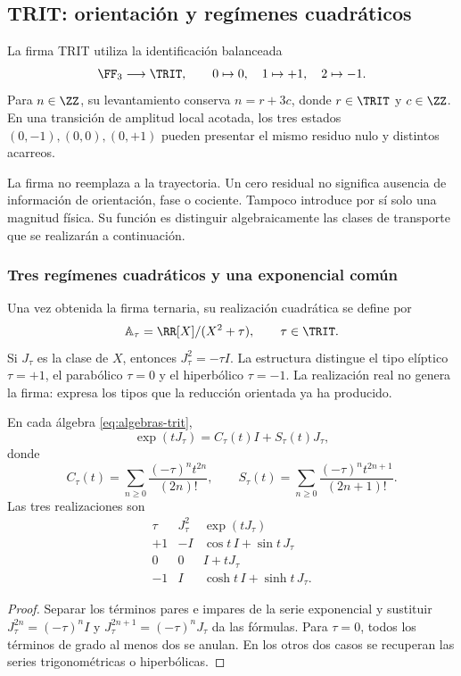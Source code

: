 \subsection{TRIT: orientación y regímenes cuadráticos}

\begin{definition}
La firma TRIT utiliza la identificación balanceada
\[
 \FF_3\longrightarrow\TRIT,\qquad 0\mapsto0,\quad1\mapsto+1,\quad2\mapsto-1.
\]
Para \(n\in\ZZ\), su levantamiento conserva \(n=r+3c\), donde \(r\in\TRIT\) y \(c\in\ZZ\). En una transición de amplitud local acotada, los tres estados \((0,-1),(0,0),(0,+1)\) pueden presentar el mismo residuo nulo y distintos acarreos.
\end{definition}

La firma no reemplaza a la trayectoria. Un cero residual no significa ausencia de información de orientación, fase o cociente. Tampoco introduce por sí solo una magnitud física. Su función es distinguir algebraicamente las clases de transporte que se realizarán a continuación.

\subsubsection{Tres regímenes cuadráticos y una exponencial común}

Una vez obtenida la firma ternaria, su realización cuadrática se define por
\begin{equation}
 \mathbb A_\tau=\RR[X]/(X^2+\tau),\qquad \tau\in\TRIT.
 \label{eq:algebras-trit}
\end{equation}
Si \(J_\tau\) es la clase de \(X\), entonces \(J_\tau^2=-\tau I\). La estructura distingue el tipo elíptico \(\tau=+1\), el parabólico \(\tau=0\) y el hiperbólico \(\tau=-1\). La realización real no genera la firma: expresa los tipos que la reducción orientada ya ha producido.

\begin{proposition}
En cada álgebra \eqref{eq:algebras-trit},
\begin{equation}
 \exp(tJ_\tau)=C_\tau(t)I+S_\tau(t)J_\tau,
\end{equation}
donde
\[
 C_\tau(t)=\sum_{n\ge0}\frac{(-\tau)^nt^{2n}}{(2n)!},\qquad
 S_\tau(t)=\sum_{n\ge0}\frac{(-\tau)^nt^{2n+1}}{(2n+1)!}.
\]
Las tres realizaciones son
\[
 \begin{array}{c|c|c}
 \tau&J_\tau^2&\exp(tJ_\tau)\\\hline
 +1&-I&\cos t\,I+\sin t\,J_\tau\\
 0&0&I+tJ_\tau\\
 -1&I&\cosh t\,I+\sinh t\,J_\tau.
 \end{array}
\]
\end{proposition}
\begin{proof}
Separar los términos pares e impares de la serie exponencial y sustituir \(J_\tau^{2n}=(-\tau)^nI\) y \(J_\tau^{2n+1}=(-\tau)^nJ_\tau\) da las fórmulas. Para \(\tau=0\), todos los términos de grado al menos dos se anulan. En los otros dos casos se recuperan las series trigonométricas o hiperbólicas.
\end{proof}

